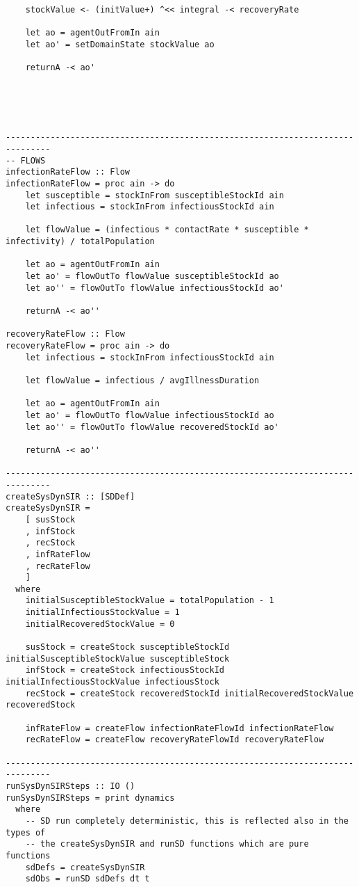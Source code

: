 \begin{verbatim}
    stockValue <- (initValue+) ^<< integral -< recoveryRate
    
    let ao = agentOutFromIn ain
    let ao' = setDomainState stockValue ao

    returnA -< ao'





-------------------------------------------------------------------------------
-- FLOWS
infectionRateFlow :: Flow
infectionRateFlow = proc ain -> do
    let susceptible = stockInFrom susceptibleStockId ain 
    let infectious = stockInFrom infectiousStockId ain

    let flowValue = (infectious * contactRate * susceptible * infectivity) / totalPopulation
    
    let ao = agentOutFromIn ain
    let ao' = flowOutTo flowValue susceptibleStockId ao
    let ao'' = flowOutTo flowValue infectiousStockId ao'

    returnA -< ao''

recoveryRateFlow :: Flow
recoveryRateFlow = proc ain -> do
    let infectious = stockInFrom infectiousStockId ain

    let flowValue = infectious / avgIllnessDuration
    
    let ao = agentOutFromIn ain
    let ao' = flowOutTo flowValue infectiousStockId ao
    let ao'' = flowOutTo flowValue recoveredStockId ao'

    returnA -< ao''

-------------------------------------------------------------------------------
createSysDynSIR :: [SDDef]
createSysDynSIR = 
    [ susStock
    , infStock
    , recStock
    , infRateFlow
    , recRateFlow
    ]
  where
    initialSusceptibleStockValue = totalPopulation - 1
    initialInfectiousStockValue = 1
    initialRecoveredStockValue = 0

    susStock = createStock susceptibleStockId initialSusceptibleStockValue susceptibleStock
    infStock = createStock infectiousStockId initialInfectiousStockValue infectiousStock
    recStock = createStock recoveredStockId initialRecoveredStockValue recoveredStock

    infRateFlow = createFlow infectionRateFlowId infectionRateFlow
    recRateFlow = createFlow recoveryRateFlowId recoveryRateFlow

-------------------------------------------------------------------------------
runSysDynSIRSteps :: IO ()
runSysDynSIRSteps = print dynamics
  where
    -- SD run completely deterministic, this is reflected also in the types of 
    -- the createSysDynSIR and runSD functions which are pure functions  
    sdDefs = createSysDynSIR
    sdObs = runSD sdDefs dt t 
            

\end{verbatim}
